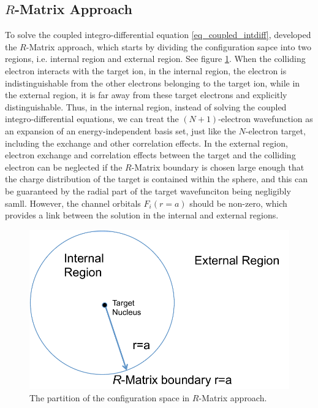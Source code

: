 \subsection{$R$-Matrix Approach}
To solve the coupled integro-differential equation \ref{eq_coupled_intdiff}, \citet{rm_1} developed the $R$-Matrix approach, which starts by dividing the configuration sapce into two regions, i.e. internal region and external region. See figure \ref{figure_rm_space}. When the colliding electron interacts with the target ion, in the internal region, the electron is indistinguishable from the other electrons belonging to the target ion, while in the external region, it is far away from these target electrons and explicitly distinguishable. Thus, in the internal region, instead of solving the coupled integro-differential equations, we can treat the $(N+1)$-electron wavefunction as an expansion of an energy-independent basis set, just like the $N$-electron target, including the exchange and other correlation effects. In the external region, electron exchange and correlation effects between the target and the colliding electron can be neglected if the $R$-Matrix boundary is chosen large enough that the charge distribution of the target is contained within the sphere, and this can be guaranteed by the radial part of the target wavefunciton being negligibly samll. However, the channel orbitals $F_i(r=a)$ should be non-zero, which provides a link between the solution in the internal and external regions.

\begin{figure}
	\centering
	\includegraphics[width=.9\textwidth]{figures_3/r_matrix_box}	
	\caption{The partition of the configuration space in $R$-Matrix approach.}
	\label{figure_rm_space}
\end{figure}

